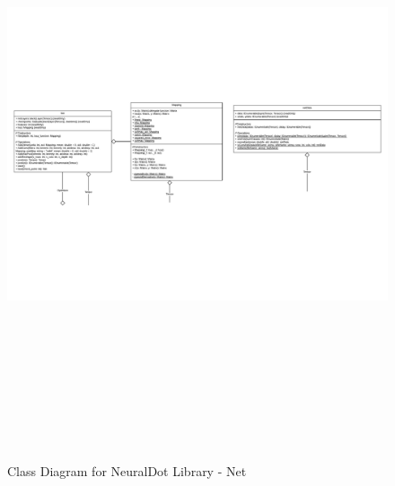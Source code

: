 \begin{figure}[H]
    \centering
    \includegraphics[width=18cm, height=18cm, angle=90]{Design/Overview/UMLCharts/NeuralDotUMLSeperated-Net.pdf}
    \caption{Class Diagram for NeuralDot Library - Net}
    \label{fig:Class Diagram for NeuralDot Library - Net}
\end{figure}

